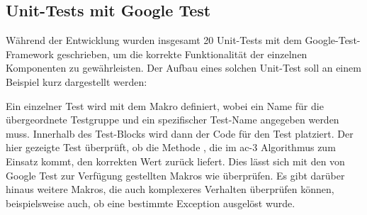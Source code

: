 \subsection{Unit-Tests mit Google Test}
Während der Entwicklung wurden insgesamt 20 Unit-Tests mit dem Google-Test-Framework geschrieben, um die korrekte Funktionalität der einzelnen Komponenten zu gewährleisten.
Der Aufbau eines solchen Unit-Test soll an einem Beispiel kurz dargestellt werden:

Ein einzelner Test wird mit dem Makro  definiert, wobei ein Name für die übergeordnete Testgruppe und ein spezifischer Test-Name angegeben werden muss. Innerhalb des
Test-Blocks wird dann der Code für den Test platziert. Der hier gezeigte Test überprüft, ob die Methode , die im \ac*{ac}-3 Algorithmus zum Einsatz
kommt, den korrekten Wert zurück liefert. Dies lässt sich mit den von Google Test zur Verfügung gestellten Makros wie  überprüfen. Es gibt darüber hinaus
weitere Makros, die auch komplexeres Verhalten überprüfen können, beispielsweise auch, ob eine bestimmte Exception ausgelöst wurde.
